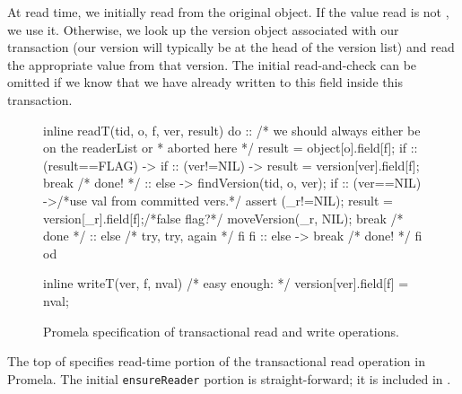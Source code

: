 At read time, we initially read from the original object.  If the
value read is not \FLAG, we use it.  Otherwise, we look up the version
object associated with our transaction (our version will typically be at the
head of the version list) and read the appropriate value from that
version.  The initial read-and-check can be omitted if we
know that we have already written to this field inside this transaction.

\begin{figure}
\begin{inlinecode}
inline readT(tid, o, f, ver, result) {
  do
  ::
     /* we should always either be on the readerList or
      * aborted here */
     result = object[o].field[f];
     if
     :: (result==FLAG) ->
        if
        :: (ver!=NIL) ->
           result = version[ver].field[f];
           break /* done! */
        :: else ->
           findVersion(tid, o, ver);
           if
           :: (ver==NIL) ->/*use val from committed vers.*/
              assert (_r!=NIL);
              result = version[_r].field[f];/*false flag?*/
              moveVersion(_r, NIL);
              break /* done */
           :: else /* try, try, again */
           fi
        fi
     :: else -> break /* done! */
     fi
  od
}

inline writeT(ver, f, nval) {
  /* easy enough: */
  version[ver].field[f] = nval;
}
\end{inlinecode}
\caption{Promela specification of transactional read and write operations.}
\label{fig:promrwt}
\end{figure}

The top of  specifies read-time portion of the
transactional read operation in
Promela.  The initial \texttt{ensureReader} portion is
straight-forward; it is included in .

